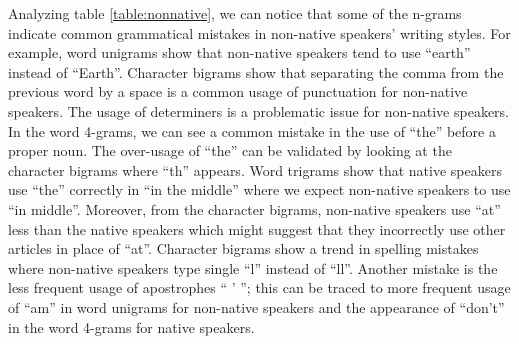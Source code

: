\documentclass[10pt,a5paper,twoside]{article}
\begin{document}
Analyzing table \ref{table:nonnative}, we can notice that some of the n-grams
indicate common grammatical mistakes in non-native speakers' writing styles.
For example, word unigrams show that non-native speakers tend to use ``earth''
instead of ``Earth''. Character bigrams show that separating the comma from the
previous word by a space is a common usage of punctuation for non-native speakers.
The usage of determiners is a problematic issue for non-native speakers. In the
word 4-grams, we can see a common mistake in the use of ``the'' before a proper
noun. The over-usage of ``the'' can be
validated by looking at the character bigrams where ``th'' appears. Word
trigrams show
that native speakers use ``the'' correctly in ``in the middle'' where we
expect non-native speakers to use ``in middle''.
Moreover, from the character bigrams, non-native speakers use ``at'' less
than the native speakers which might suggest that they incorrectly use other articles
in place of ``at''. Character bigrams show a trend in spelling
mistakes where non-native speakers type single ``l'' instead of ``ll''.
Another mistake is the less frequent usage of apostrophes `` ' '';
this can be traced to more frequent usage of ``am'' in word unigrams for
non-native speakers and the appearance of ``don't'' in the word 4-grams for native speakers.
\end{document}
